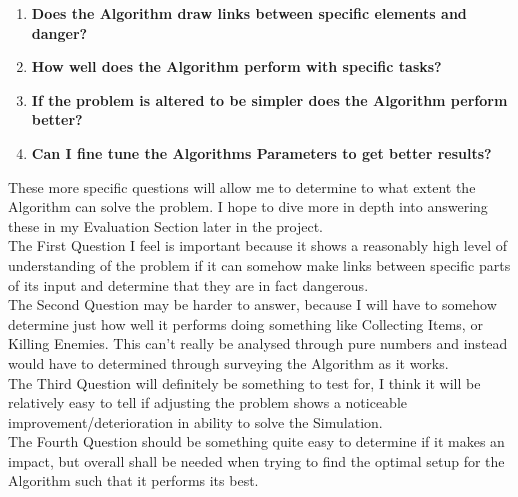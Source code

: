 \begin{flushleft}
            \begin{enumerate}
                \item \textbf{Does the Algorithm draw links between specific elements and danger?}
                \item \textbf{How well does the Algorithm perform with specific tasks?}
                \item \textbf{If the problem is altered to be simpler does the Algorithm perform better?}
                \item \textbf{Can I fine tune the Algorithms Parameters to get better results?}
            \end{enumerate}

            These more specific questions will allow me to determine to what extent the Algorithm can solve the problem.
            I hope to dive more in depth into answering these in my Evaluation Section later in the project. \\
            \vspace{0.2cm}
            The First Question I feel is important because it shows a reasonably high level of understanding of the problem
            if it can somehow make links between specific parts of its input and determine that they are in fact dangerous. \\
            \vspace{0.2cm}
            The Second Question may be harder to answer, because I will have to somehow determine just how well it 
            performs doing something like Collecting Items, or Killing Enemies. This can't really be analysed through
            pure numbers and instead would have to determined through surveying the Algorithm as it works. \\
            \vspace{0.2cm}
            The Third Question will definitely be something to test for, I think it will be relatively easy to tell if
            adjusting the problem shows a noticeable improvement/deterioration in ability to solve the Simulation. \\
            \vspace{0.2cm}
            The Fourth Question should be something quite easy to determine if it makes an impact, but overall shall
            be needed when trying to find the optimal setup for the Algorithm such that it performs its best. \\

\end{flushleft}
